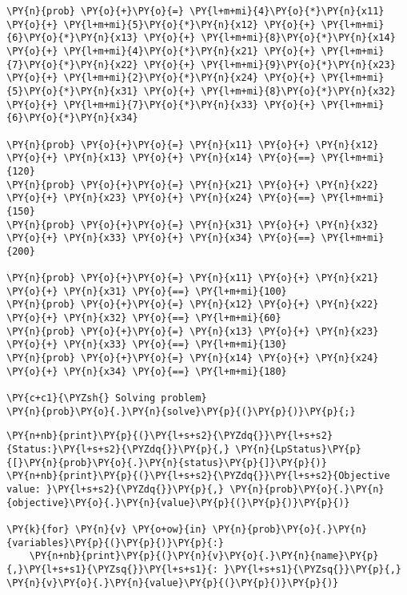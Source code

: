 \begin{tcolorbox}[breakable, size=fbox, boxrule=1pt, pad at break*=1mm,colback=cellbackground, colframe=cellborder]
\begin{Verbatim}[commandchars=\\\{\}]
\PY{n}{prob} \PY{o}{+}\PY{o}{=} \PY{l+m+mi}{4}\PY{o}{*}\PY{n}{x11} \PY{o}{+} \PY{l+m+mi}{5}\PY{o}{*}\PY{n}{x12} \PY{o}{+} \PY{l+m+mi}{6}\PY{o}{*}\PY{n}{x13} \PY{o}{+} \PY{l+m+mi}{8}\PY{o}{*}\PY{n}{x14} \PY{o}{+} \PY{l+m+mi}{4}\PY{o}{*}\PY{n}{x21} \PY{o}{+} \PY{l+m+mi}{7}\PY{o}{*}\PY{n}{x22} \PY{o}{+} \PY{l+m+mi}{9}\PY{o}{*}\PY{n}{x23} \PY{o}{+} \PY{l+m+mi}{2}\PY{o}{*}\PY{n}{x24} \PY{o}{+} \PY{l+m+mi}{5}\PY{o}{*}\PY{n}{x31} \PY{o}{+} \PY{l+m+mi}{8}\PY{o}{*}\PY{n}{x32} \PY{o}{+} \PY{l+m+mi}{7}\PY{o}{*}\PY{n}{x33} \PY{o}{+} \PY{l+m+mi}{6}\PY{o}{*}\PY{n}{x34}

\PY{n}{prob} \PY{o}{+}\PY{o}{=} \PY{n}{x11} \PY{o}{+} \PY{n}{x12} \PY{o}{+} \PY{n}{x13} \PY{o}{+} \PY{n}{x14} \PY{o}{==} \PY{l+m+mi}{120}
\PY{n}{prob} \PY{o}{+}\PY{o}{=} \PY{n}{x21} \PY{o}{+} \PY{n}{x22} \PY{o}{+} \PY{n}{x23} \PY{o}{+} \PY{n}{x24} \PY{o}{==} \PY{l+m+mi}{150}
\PY{n}{prob} \PY{o}{+}\PY{o}{=} \PY{n}{x31} \PY{o}{+} \PY{n}{x32} \PY{o}{+} \PY{n}{x33} \PY{o}{+} \PY{n}{x34} \PY{o}{==} \PY{l+m+mi}{200}

\PY{n}{prob} \PY{o}{+}\PY{o}{=} \PY{n}{x11} \PY{o}{+} \PY{n}{x21} \PY{o}{+} \PY{n}{x31} \PY{o}{==} \PY{l+m+mi}{100}
\PY{n}{prob} \PY{o}{+}\PY{o}{=} \PY{n}{x12} \PY{o}{+} \PY{n}{x22} \PY{o}{+} \PY{n}{x32} \PY{o}{==} \PY{l+m+mi}{60}
\PY{n}{prob} \PY{o}{+}\PY{o}{=} \PY{n}{x13} \PY{o}{+} \PY{n}{x23} \PY{o}{+} \PY{n}{x33} \PY{o}{==} \PY{l+m+mi}{130}
\PY{n}{prob} \PY{o}{+}\PY{o}{=} \PY{n}{x14} \PY{o}{+} \PY{n}{x24} \PY{o}{+} \PY{n}{x34} \PY{o}{==} \PY{l+m+mi}{180}

\PY{c+c1}{\PYZsh{} Solving problem}
\PY{n}{prob}\PY{o}{.}\PY{n}{solve}\PY{p}{(}\PY{p}{)}\PY{p}{;}
\end{Verbatim}
\end{tcolorbox}

    \begin{tcolorbox}[breakable, size=fbox, boxrule=1pt, pad at break*=1mm,colback=cellbackground, colframe=cellborder]
\begin{Verbatim}[commandchars=\\\{\}]
\PY{n+nb}{print}\PY{p}{(}\PY{l+s+s2}{\PYZdq{}}\PY{l+s+s2}{Status:}\PY{l+s+s2}{\PYZdq{}}\PY{p}{,} \PY{n}{LpStatus}\PY{p}{[}\PY{n}{prob}\PY{o}{.}\PY{n}{status}\PY{p}{]}\PY{p}{)}
\PY{n+nb}{print}\PY{p}{(}\PY{l+s+s2}{\PYZdq{}}\PY{l+s+s2}{Objective value: }\PY{l+s+s2}{\PYZdq{}}\PY{p}{,} \PY{n}{prob}\PY{o}{.}\PY{n}{objective}\PY{o}{.}\PY{n}{value}\PY{p}{(}\PY{p}{)}\PY{p}{)}

\PY{k}{for} \PY{n}{v} \PY{o+ow}{in} \PY{n}{prob}\PY{o}{.}\PY{n}{variables}\PY{p}{(}\PY{p}{)}\PY{p}{:}
    \PY{n+nb}{print}\PY{p}{(}\PY{n}{v}\PY{o}{.}\PY{n}{name}\PY{p}{,}\PY{l+s+s1}{\PYZsq{}}\PY{l+s+s1}{: }\PY{l+s+s1}{\PYZsq{}}\PY{p}{,} \PY{n}{v}\PY{o}{.}\PY{n}{value}\PY{p}{(}\PY{p}{)}\PY{p}{)}
\end{Verbatim}
\end{tcolorbox}

